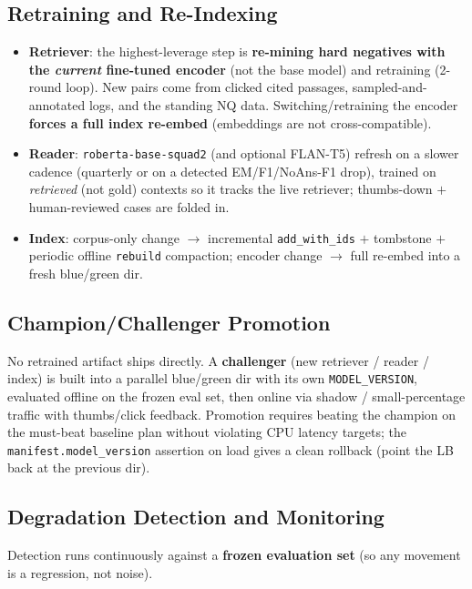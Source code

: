 \documentclass[12pt,a4paper]{article}
\begin{document}
\subsection{Retraining and Re-Indexing}

\begin{itemize}\setlength\itemsep{0.15em}
  \item \textbf{Retriever}: the highest-leverage step is \textbf{re-mining hard negatives with the \emph{current} fine-tuned encoder} (not the base model) and retraining (2-round loop). New pairs come from clicked cited passages, sampled-and-annotated logs, and the standing NQ data. Switching/retraining the encoder \textbf{forces a full index re-embed} (embeddings are not cross-compatible).
  \item \textbf{Reader}: \texttt{roberta-base-squad2} (and optional FLAN-T5) refresh on a slower cadence (quarterly or on a detected EM/F1/NoAns-F1 drop), trained on \emph{retrieved} (not gold) contexts so it tracks the live retriever; thumbs-down $+$ human-reviewed cases are folded in.
  \item \textbf{Index}: corpus-only change $\rightarrow$ incremental \texttt{add\_with\_ids} $+$ tombstone $+$ periodic offline \texttt{rebuild} compaction; encoder change $\rightarrow$ full re-embed into a fresh blue/green dir.
\end{itemize}

\subsection{Champion/Challenger Promotion}

No retrained artifact ships directly. A \textbf{challenger} (new retriever / reader / index) is built into a parallel blue/green dir with its own \texttt{MODEL\_VERSION}, evaluated offline on the frozen eval set, then online via shadow / small-percentage traffic with thumbs/click feedback. Promotion requires beating the champion on the must-beat baseline plan without violating CPU latency targets; the \texttt{manifest.model\_version} assertion on load gives a clean rollback (point the LB back at the previous dir).

\subsection{Degradation Detection and Monitoring}

Detection runs continuously against a \textbf{frozen evaluation set} (so any movement is a regression, not noise).
\end{document}

